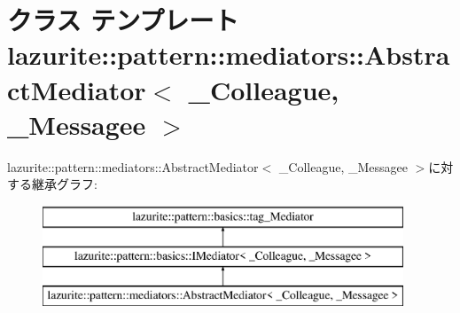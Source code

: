 \hypertarget{classlazurite_1_1pattern_1_1mediators_1_1_abstract_mediator_3_01___colleague_00_01___messagee_01_4}{
\section{クラス テンプレート lazurite::pattern::mediators::AbstractMediator$<$ \_\-Colleague, \_\-Messagee $>$}
\label{classlazurite_1_1pattern_1_1mediators_1_1_abstract_mediator_3_01___colleague_00_01___messagee_01_4}
}
lazurite::pattern::mediators::AbstractMediator$<$ \_\-Colleague, \_\-Messagee $>$に対する継承グラフ:\begin{figure}[H]
\begin{center}
\leavevmode
\includegraphics[height=3cm]{classlazurite_1_1pattern_1_1mediators_1_1_abstract_mediator_3_01___colleague_00_01___messagee_01_4}
\end{center}
\end{figure}

